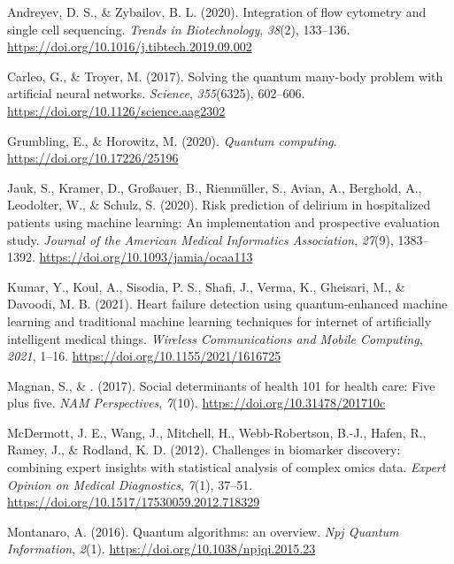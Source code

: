 \documentclass{scrartcl}
\begin{document}
\begin{hangparas}{1.5em}{1}
\hypertarget{citeproc_bib_item_1}{Andreyev, D. S., \& Zybailov, B. L. (2020). Integration of flow cytometry and single cell sequencing. \textit{Trends in Biotechnology}, \textit{38}(2), 133–136. \url{https://doi.org/10.1016/j.tibtech.2019.09.002}}

\hypertarget{citeproc_bib_item_2}{Carleo, G., \& Troyer, M. (2017). Solving the quantum many-body problem with artificial neural networks. \textit{Science}, \textit{355}(6325), 602–606. \url{https://doi.org/10.1126/science.aag2302}}

\hypertarget{citeproc_bib_item_3}{Grumbling, E., \& Horowitz, M. (2020). \textit{Quantum computing}. \url{https://doi.org/10.17226/25196}}

\hypertarget{citeproc_bib_item_4}{Jauk, S., Kramer, D., Großauer, B., Rienmüller, S., Avian, A., Berghold, A., Leodolter, W., \& Schulz, S. (2020). Risk prediction of delirium in hospitalized patients using machine learning: An implementation and prospective evaluation study. \textit{Journal of the American Medical Informatics Association}, \textit{27}(9), 1383–1392. \url{https://doi.org/10.1093/jamia/ocaa113}}

\hypertarget{citeproc_bib_item_5}{Kumar, Y., Koul, A., Sisodia, P. S., Shafi, J., Verma, K., Gheisari, M., \& Davoodi, M. B. (2021). Heart failure detection using quantum-enhanced machine learning and traditional machine learning techniques for internet of artificially intelligent medical things. \textit{Wireless Communications and Mobile Computing}, \textit{2021}, 1–16. \url{https://doi.org/10.1155/2021/1616725}}

\hypertarget{citeproc_bib_item_6}{Magnan, S., \& . (2017). Social determinants of health 101 for health care: Five plus five. \textit{NAM Perspectives}, \textit{7}(10). \url{https://doi.org/10.31478/201710c}}

\hypertarget{citeproc_bib_item_7}{McDermott, J. E., Wang, J., Mitchell, H., Webb-Robertson, B.-J., Hafen, R., Ramey, J., \& Rodland, K. D. (2012). Challenges in biomarker discovery: combining expert insights with statistical analysis of complex omics data. \textit{Expert Opinion on Medical Diagnostics}, \textit{7}(1), 37–51. \url{https://doi.org/10.1517/17530059.2012.718329}}

\hypertarget{citeproc_bib_item_8}{Montanaro, A. (2016). Quantum algorithms: an overview. \textit{Npj Quantum Information}, \textit{2}(1). \url{https://doi.org/10.1038/npjqi.2015.23}}


\end{hangparas}
\end{document}
